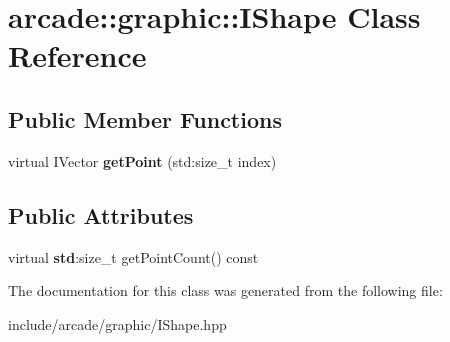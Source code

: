 \hypertarget{classarcade_1_1graphic_1_1_i_shape}{}\section{arcade\+::graphic\+::I\+Shape Class Reference}
\label{classarcade_1_1graphic_1_1_i_shape}
\subsection*{Public Member Functions}
\begin{DoxyCompactItemize}
\item 
\mbox{\label{classarcade_1_1graphic_1_1_i_shape_a3a7edac1674a47bda8a952e20fad5b42}} 
virtual I\+Vector {\bfseries get\+Point} (std\+:size\+\_\+t index)
\end{DoxyCompactItemize}
\subsection*{Public Attributes}
\begin{DoxyCompactItemize}
\item 
\mbox{\label{classarcade_1_1graphic_1_1_i_shape_a04c3c28c02b3c3cbb981c2f93ecbaf45}} 
virtual {\bfseries std}\+:size\+\_\+t get\+Point\+Count() const
\end{DoxyCompactItemize}


The documentation for this class was generated from the following file\+:\begin{DoxyCompactItemize}
\item 
include/arcade/graphic/I\+Shape.\+hpp\end{DoxyCompactItemize}
